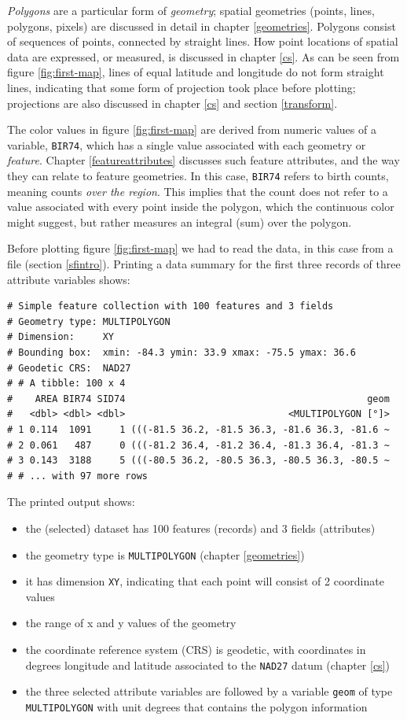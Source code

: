 \documentclass[]{book}
\providecommand{\tightlist}{%
  \setlength{\itemsep}{0pt}\setlength{\parskip}{0pt}}
\begin{document}
\emph{Polygons} are a particular form of \emph{geometry}; spatial geometries
(points, lines, polygons, pixels) are discussed in detail in
chapter \ref{geometries}. Polygons consist of sequences of points,
connected by straight lines. How point locations of spatial data are
expressed, or measured, is discussed in chapter \ref{cs}. As can
be seen from figure \ref{fig:first-map}, lines of equal latitude
and longitude do not form straight lines, indicating that some
form of projection took place before plotting; projections are also
discussed in chapter \ref{cs} and section \ref{transform}.

The color values in figure \ref{fig:first-map} are derived
from numeric values of a variable, \texttt{BIR74}, which has a
single value associated with each geometry or \emph{feature}. Chapter
\ref{featureattributes} discusses such feature attributes, and the
way they can relate to feature geometries. In this case, \texttt{BIR74}
refers to birth counts, meaning counts \emph{over the region}. This
implies that the count does not refer to a value associated with
every point inside the polygon, which the continuous color might
suggest, but rather measures an integral (sum) over the polygon.

Before plotting figure \ref{fig:first-map} we had to read the data,
in this case from a file (section \ref{sfintro}). Printing a data
summary for the first three records of three attribute variables
shows:

\begin{verbatim}
# Simple feature collection with 100 features and 3 fields
# Geometry type: MULTIPOLYGON
# Dimension:     XY
# Bounding box:  xmin: -84.3 ymin: 33.9 xmax: -75.5 ymax: 36.6
# Geodetic CRS:  NAD27
# # A tibble: 100 x 4
#    AREA BIR74 SID74                                           geom
#   <dbl> <dbl> <dbl>                             <MULTIPOLYGON [°]>
# 1 0.114  1091     1 (((-81.5 36.2, -81.5 36.3, -81.6 36.3, -81.6 ~
# 2 0.061   487     0 (((-81.2 36.4, -81.2 36.4, -81.3 36.4, -81.3 ~
# 3 0.143  3188     5 (((-80.5 36.2, -80.5 36.3, -80.5 36.3, -80.5 ~
# # ... with 97 more rows
\end{verbatim}

The printed output shows:

\begin{itemize}
\tightlist
\item
  the (selected) dataset has 100 features (records) and 3 fields (attributes)
\item
  the geometry type is \texttt{MULTIPOLYGON} (chapter \ref{geometries})
\item
  it has dimension \texttt{XY}, indicating that each point will consist of 2 coordinate values
\item
  the range of x and y values of the geometry
\item
  the coordinate reference system (CRS) is geodetic, with coordinates in degrees longitude and latitude associated to the \texttt{NAD27} datum (chapter \ref{cs})
\item
  the three selected attribute variables are followed by a variable \texttt{geom} of type \texttt{MULTIPOLYGON} with unit degrees that contains the polygon information
\end{itemize}
\end{document}
